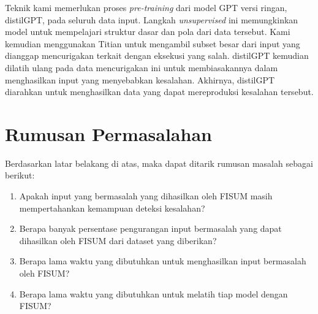 Teknik kami memerlukan proses \emph{pre-training} dari model GPT versi ringan, distilGPT, pada seluruh data input. Langkah \emph{unsupervised} ini memungkinkan model untuk mempelajari struktur dasar dan pola dari data tersebut. Kami kemudian menggunakan Titian untuk mengambil subset besar dari input yang dianggap mencurigakan terkait dengan eksekusi yang salah. distilGPT kemudian dilatih ulang pada data mencurigakan ini untuk membiasakannya dalam menghasilkan input yang menyebabkan kesalahan. Akhirnya, distilGPT diarahkan untuk menghasilkan data yang dapat mereproduksi kesalahan tersebut.


\section{Rumusan Permasalahan}
\label{sec:permasalahan}

Berdasarkan latar belakang di atas, maka dapat ditarik rumusan masalah sebagai berikut:

\begin{enumerate}[nolistsep]

   \item Apakah input yang bermasalah yang dihasilkan oleh FISUM masih mempertahankan kemampuan deteksi kesalahan?

   \item Berapa banyak persentase pengurangan input bermasalah yang dapat dihasilkan oleh FISUM dari dataset yang diberikan?

   \item Berapa lama waktu yang dibutuhkan untuk menghasilkan input bermasalah oleh FISUM?
   
   \item Berapa lama waktu yang dibutuhkan untuk melatih tiap model dengan FISUM?

\end{enumerate}

